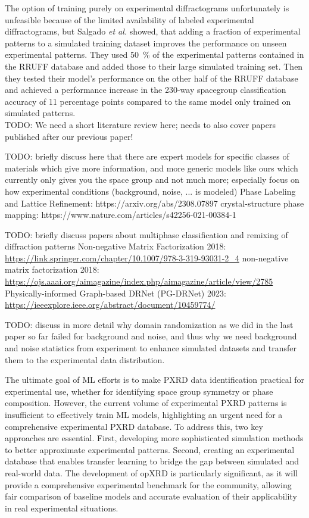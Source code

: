 The option of training purely on experimental diffractograms unfortunately is unfeasible because of the limited availability of labeled experimental diffractograms, but Salgado {\it et al.} \cite{Salgado2023} showed, that adding a fraction of experimental patterns to a simulated training dataset improves the performance on unseen experimental patterns. They used \SI{50}{\percent} of the experimental patterns contained in the RRUFF database and added those to their large simulated training set. Then they tested their model's performance on the other half of the RRUFF database and achieved a performance increase in the 230-way spacegroup classification accuracy of \num{11} percentage points compared to the same model only trained on simulated patterns. \\

TODO: We need a short literature review here; needs to also cover papers published after our previous paper!

TODO: briefly discuss here that there are expert models for specific classes of materials which give more information, and more generic models like ours which currently only gives you the space group and not much more; especially focus on how experimental conditions (background, noise, ... is modeled)
Phase Labeling and Lattice Refinement: https://arxiv.org/abs/2308.07897
crystal-structure phase mapping: https://www.nature.com/articles/s42256-021-00384-1


TODO: briefly discuss papers about multiphase classification and remixing of diffraction patterns
Non-negative Matrix Factorization 2018: \url{https://link.springer.com/chapter/10.1007/978-3-319-93031-2_4}
non-negative matrix factorization 2018: \url{https://ojs.aaai.org/aimagazine/index.php/aimagazine/article/view/2785}
Physically-informed Graph-based DRNet (PG-DRNet) 2023: \url{https://ieeexplore.ieee.org/abstract/document/10459774/}

TODO: discuss in more detail why domain randomization as we did in the last paper so far failed for background and noise, and thus why we need background and noise statistics from experiment to enhance simulated datasets and transfer them to the experimental data distribution.

The ultimate goal of ML efforts is to make PXRD data identification practical for experimental use, whether for identifying space group symmetry or phase composition. However, the current volume of experimental PXRD patterns is insufficient to effectively train ML models, highlighting an urgent need for a comprehensive experimental PXRD database. To address this, two key approaches are essential. First, developing more sophisticated simulation methods to better approximate experimental patterns\cite{cao2024simxrd}. Second, creating an experimental database that enables transfer learning to bridge the gap between simulated and real-world data. The development of opXRD is particularly significant, as it will provide a comprehensive experimental benchmark for the community, allowing fair comparison of baseline models and accurate evaluation of their applicability in real experimental situations.